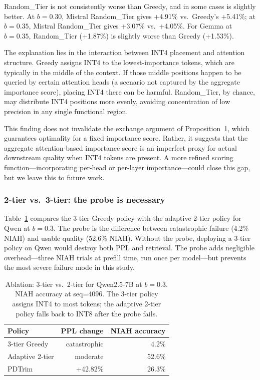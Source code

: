 \documentclass[11pt]{article}
\newcommand{\budget}{b}
\newcommand{\pct}{\%}
\theoremstyle{plain}
\theoremstyle{definition}
\begin{document}
Random\_Tier is not consistently worse than Greedy, and in some cases is slightly better.  At $\budget=0.30$, Mistral Random\_Tier gives +4.91\pct{} vs.\ Greedy's +5.41\pct{}; at $\budget=0.35$, Mistral Random\_Tier gives +3.07\pct{} vs.\ +4.05\pct{}.  For Gemma at $\budget=0.35$, Random\_Tier (+1.87\pct{}) is slightly worse than Greedy (+1.53\pct{}).

The explanation lies in the interaction between INT4 placement and attention structure.  Greedy assigns INT4 to the lowest-importance tokens, which are typically in the middle of the context.  If those middle positions happen to be queried by certain attention heads (a scenario not captured by the aggregate importance score), placing INT4 there can be harmful.  Random\_Tier, by chance, may distribute INT4 positions more evenly, avoiding concentration of low precision in any single functional region.

This finding does not invalidate the exchange argument of Proposition~1, which guarantees optimality for a fixed importance score.  Rather, it suggests that the aggregate attention-based importance score is an imperfect proxy for actual downstream quality when INT4 tokens are present.  A more refined scoring function---incorporating per-head or per-layer importance---could close this gap, but we leave this to future work.

\subsubsection{2-tier vs.\ 3-tier: the probe is necessary}
\label{sec:ablation-probe}

Table~\ref{tab:ablation-probe} compares the 3-tier Greedy policy with the adaptive 2-tier policy for Qwen at $\budget=0.3$.  The probe is the difference between catastrophic failure (4.2\pct{} NIAH) and usable quality (52.6\pct{} NIAH).  Without the probe, deploying a 3-tier policy on Qwen would destroy both PPL and retrieval.  The probe adds negligible overhead---three NIAH trials at prefill time, run once per model---but prevents the most severe failure mode in this study.

\begin{table}[t]
\centering
\caption{Ablation: 3-tier vs.\ 2-tier for Qwen2.5-7B at $\budget=0.3$.  NIAH accuracy at seq=4096.  The 3-tier policy assigns INT4 to most tokens; the adaptive 2-tier policy falls back to INT8 after the probe fails.}
\label{tab:ablation-probe}
\small
\begin{tabular}{lrr}
\toprule
Policy & PPL change & NIAH accuracy \\
\midrule
3-tier Greedy & catastrophic & 4.2\pct{} \\
Adaptive 2-tier & moderate & 52.6\pct{} \\
PDTrim & +42.82\pct{} & 26.3\pct{} \\
\bottomrule
\end{tabular}
\end{table}
\end{document}
